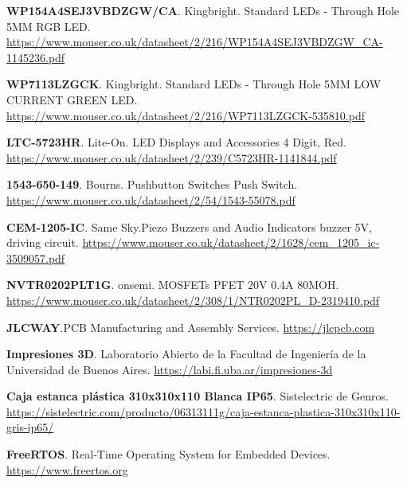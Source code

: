 \begin{thebibliography}{30}
\textbf{WP154A4SEJ3VBDZGW/CA}. Kingbright. Standard LEDs - Through Hole 5MM RGB LED.
\href{https://www.mouser.co.uk/datasheet/2/216/WP154A4SEJ3VBDZGW_CA-1145236.pdf}{https://www.mouser.co.uk/datasheet/2/216/WP154A4SEJ3VBDZGW\_CA-1145236.pdf}


\textbf{WP7113LZGCK}. Kingbright. Standard LEDs - Through Hole 5MM LOW CURRENT GREEN LED.
\href{https://www.mouser.co.uk/datasheet/2/216/WP7113LZGCK-535810.pdf}{https://www.mouser.co.uk/datasheet/2/216/WP7113LZGCK-535810.pdf}

\textbf{LTC-5723HR}. Lite-On. LED Displays and Accessories 4 Digit, Red. 
\href{https://www.mouser.co.uk/datasheet/2/239/C5723HR-1141844.pdf}{https://www.mouser.co.uk/datasheet/2/239/C5723HR-1141844.pdf}

\textbf{1543-650-149}. Bourns. Pushbutton Switches Push Switch.
\href{https://www.mouser.co.uk/datasheet/2/54/1543-55078.pdf}{https://www.mouser.co.uk/datasheet/2/54/1543-55078.pdf}

\textbf{CEM-1205-IC}. Same Sky.Piezo Buzzers and Audio Indicators buzzer 5V, driving circuit.
\href{https://www.mouser.co.uk/datasheet/2/1628/cem_1205_ic-3509057.pdf}{https://www.mouser.co.uk/datasheet/2/1628/cem\_1205\_ic-3509057.pdf}


\textbf{NVTR0202PLT1G}. onsemi. MOSFETs PFET 20V 0.4A 80MOH.
\href{https://www.mouser.co.uk/datasheet/2/308/1/NTR0202PL_D-2319410.pdf}{https://www.mouser.co.uk/datasheet/2/308/1/NTR0202PL\_D-2319410.pdf}


\textbf{JLCWAY}.PCB Manufacturing and Assembly Services.
\href{https://jlcpcb.com}{https://jlcpcb.com}

\textbf{Impresiones 3D}. Laboratorio Abierto de la Facultad de Ingeniería de la Universidad de Buenos Aires.
\href{https://labi.fi.uba.ar/impresiones-3d}{https://labi.fi.uba.ar/impresiones-3d}

\textbf{Caja estanca plástica 310x310x110 Blanca IP65}. Sistelectric de Genros.
\href{https://sistelectric.com/producto/06313111g/caja-estanca-plastica-310x310x110-gris-ip65/}{https://sistelectric.com/producto/06313111g/caja-estanca-plastica-310x310x110-gris-ip65/}


\textbf{FreeRTOS}. Real-Time Operating System for Embedded Devices.
\href{https://www.freertos.org}{https://www.freertos.org}





\end{thebibliography}
